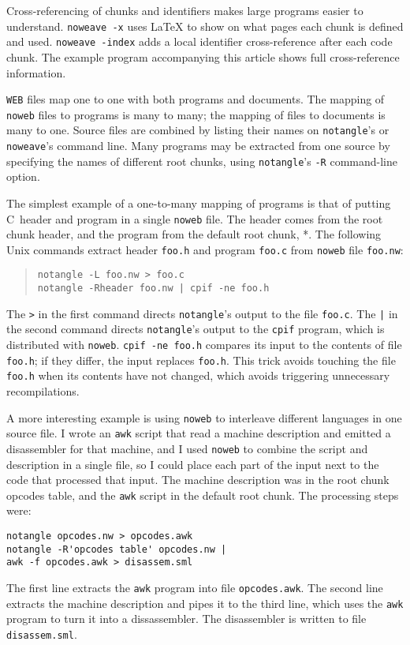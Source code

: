 Cross-referencing of chunks and identifiers makes large programs
easier to understand.
\verb+noweave -x+ uses {\LaTeX}
to show on what pages each chunk is defined and used.
\verb+noweave -index+ adds a local identifier cross-reference after
each code chunk.
The example program accompanying this article shows full cross-reference
information. 


{\tt WEB} files map one to one with both programs and documents.
The mapping of \verb+noweb+ files to programs is many to many; the
mapping of files to documents is many to one.
Source files are combined by listing their names on \verb+notangle+'s
or \verb+noweave+'s command line.
Many programs may be extracted from one source by specifying the names
of different root chunks, using \verb+notangle+'s \verb+-R+ command-line
option.

The simplest example of a one-to-many mapping of programs is that of putting
C~header and program in a single {\tt noweb} file.
The header comes from the root chunk \LA{}header\RA{}, and the program
from the default root chunk, \LA{}*\RA{}.
The following Unix commands extract header \verb+foo.h+ and program
\verb+foo.c+ from {\tt noweb} file \verb+foo.nw+:
\begin{quote} 
\begin{verbatim}
notangle -L foo.nw > foo.c
notangle -Rheader foo.nw | cpif -ne foo.h
\end{verbatim}
\end{quote}
The \verb+>+ in the first command directs \verb+notangle+'s output to
the file \verb+foo.c+.
The \verb+|+ in the second command directs \verb+notangle+'s output to
the \verb+cpif+ program, which is distributed with {\tt noweb}.
\verb+cpif -ne foo.h+ compares its input to the contents of file
\verb+foo.h+;  if they differ, the input replaces \verb+foo.h+.
This trick avoids touching the file \verb+foo.h+ when its contents
have not changed, which avoids triggering unnecessary recompilations.

A more interesting example is using {\tt noweb} to
interleave different languages in one source file. 
I wrote an \verb+awk+
script that read a machine description and emitted a disassembler for
that machine, and I used {\tt noweb} to combine the script and description
in a single file, so I could place each part of the input next to the
code that processed that input. 
The machine description was in the root chunk \LA{}opcodes
table\RA{}, and the \verb+awk+ script in the default root chunk.
The processing steps were:
\begin{verbatim}
notangle opcodes.nw > opcodes.awk
notangle -R'opcodes table' opcodes.nw | 
awk -f opcodes.awk > disassem.sml
\end{verbatim}
The first line extracts the {\tt awk} program into file {\tt opcodes.awk}.
The second line extracts the machine description and pipes it to the
third line, which uses the {\tt awk} program to turn it into a
dissassembler.
The disassembler is written to file {\tt disassem.sml}.

